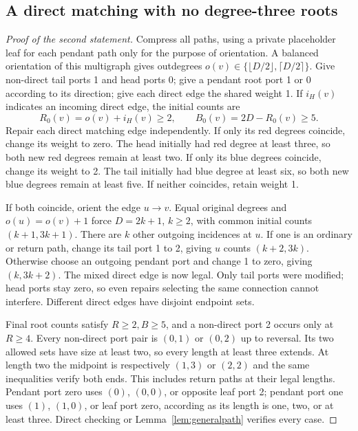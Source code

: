 \subsection{A direct matching with no degree-three roots}
\begin{proof}[Proof of the second statement]
Compress all paths, using a private placeholder leaf for each pendant
path only for the purpose of orientation. A balanced orientation of
this multigraph gives outdegrees $o(v)\in\{\lfloor D/2\rfloor,
\lceil D/2\rceil\}$. Give non-direct tail ports 1 and head ports 0;
give a pendant root port 1 or 0 according to its direction; give each
direct edge the shared weight 1. If $i_H(v)$ indicates an incoming
direct edge, the initial counts are
\[
 R_0(v)=o(v)+i_H(v)\ge2,\qquad
 B_0(v)=2D-R_0(v)\ge5.
\]
Repair each direct matching edge independently. If only its red
degrees coincide, change its weight to zero. The head initially had
red degree at least three, so both new red degrees remain at least
two. If only its blue degrees coincide, change its weight to 2.
The tail initially had blue degree at least six, so both new blue
degrees remain at least five. If neither coincides, retain weight 1.

If both coincide, orient the edge $u\to v$. Equal original degrees
and $o(u)=o(v)+1$ force $D=2k+1$, $k\ge2$, with common initial
counts $(k+1,3k+1)$. There are $k$ other outgoing incidences at $u$.
If one is an ordinary or return path, change its tail port 1 to 2,
giving $u$ counts $(k+2,3k)$. Otherwise choose an outgoing pendant
port and change 1 to zero, giving $(k,3k+2)$. The mixed direct edge
is now legal. Only tail ports were modified; head ports stay zero,
so even repairs selecting the same connection cannot interfere.
Different direct edges have disjoint endpoint sets.

Final root counts satisfy $R\ge2,B\ge5$, and a non-direct port 2
occurs only at $R\ge4$. Every non-direct port pair is $(0,1)$ or
$(0,2)$ up to reversal. Its two allowed sets have size at least two,
so every length at least three extends. At length two the midpoint
is respectively $(1,3)$ or $(2,2)$ and the same inequalities verify
both ends. This includes return paths at their legal lengths.
Pendant port zero uses $(0)$, $(0,0)$, or opposite leaf port 2;
pendant port one uses $(1)$, $(1,0)$, or leaf port zero, according
as its length is one, two, or at least three. Direct checking or
Lemma~\ref{lem:generalpath} verifies every case.
\end{proof}

